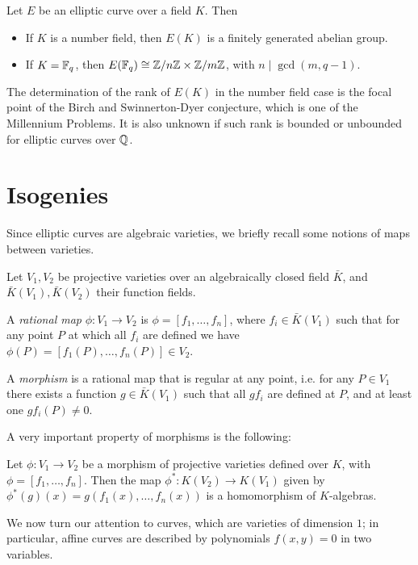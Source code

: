 \begin{theorem}
    Let $E$ be an elliptic curve over a field $K$. Then
    \begin{itemize}
        \item If $K$ is a number field, then $E(K)$ is a finitely generated abelian group.
        \item If $K=\mathbb{F}_q$, then $E(\mathbb{F}_q)\cong\mathbb{Z}/n\mathbb{Z}\times\mathbb{Z}/m\mathbb{Z}$, with $n\mid\gcd(m, q-1)$.
    \end{itemize}
\end{theorem}

The determination of the rank of $E(K)$ in the number field case is the focal point of the Birch and Swinnerton-Dyer conjecture, which is one of the Millennium Problems. It is also unknown if such rank is bounded or unbounded for elliptic curves over $\mathbb{Q}$.

\section{Isogenies}

Since elliptic curves are algebraic varieties, we briefly recall some notions of maps between varieties.

\begin{definition}
    Let $V_1,V_2$ be projective varieties over an algebraically closed field $\bar K$, and $\bar K(V_1), \bar K(V_2)$ their function fields.
    
    A \emph{rational map} $\phi:V_1\to V_2$ is $\phi=[f_1,\dots,f_n]$, where $f_i\in\bar K(V_1)$ such that for any point $P$ at which all $f_i$ are defined we have $\phi(P)=[f_1(P),\dots,f_n(P)]\in V_2$.
    
    A \emph{morphism} is a rational map that is regular at any point, i.e. for any $P\in V_1$ there exists a function $g\in\bar K(V_1)$ such that all $gf_i$ are defined at $P$, and at least one $gf_i(P)\neq0$.
\end{definition}

A very important property of morphisms is the following:
\begin{proposition}
    Let $\phi: V_1\to V_2$ be a morphism of projective varieties defined over $K$, with $\phi=[f_1,\dots,f_n]$. Then the map $\phi^\ast:K(V_2)\to K(V_1)$ given by $\phi^\ast(g)(x)=g(f_1(x),\dots,f_n(x))$ is a homomorphism of $K$-algebras.
\end{proposition}

We now turn our attention to curves, which are varieties of dimension $1$; in particular, affine curves are described by polynomials $f(x,y)=0$ in two variables.

